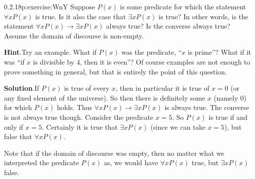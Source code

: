 \documentclass[twoside,11pt,]{book}
\newcommand{\blocktitlefont}{\relax}
\numberwithin{equation}{chapter}
\newcommand{\imp}{\rightarrow}
\begin{document}
\begin{divisionsolution}{0.2.18}{}{p:exercise:WnY}%
Suppose \(P(x)\) is some predicate for which the statement \(\forall x P(x)\) is true. Is it also the case that \(\exists x P(x)\) is true? In other words, is the statement \(\forall x P(x) \imp \exists x P(x)\) always true? Is the converse always true?  Assume the domain of discourse is non-empty.%
\par\smallskip%
\noindent\textbf{\blocktitlefont Hint}.\quad{}Try an example.  What if \(P(x)\) was the predicate, ``\(x\) is prime''?  What if it was ``if \(x\) is divisible by 4, then it is even''?  Of course examples are not enough to prove something in general, but that is entirely the point of this question.%
\par\smallskip%
\noindent\textbf{\blocktitlefont Solution}.\quad{}If \(P(x)\) is true of every \(x\), then in particular it is true of \(x = 0\) (or any fixed element of the universe). So then there is definitely some \(x\) (namely 0) for which \(P(x)\) holds. Thus \(\forall x P(x) \imp \exists x P(x)\) is always true. The converse is not always true though. Consider the predicate \(x = 5\). So \(P(x)\) is true if and only if \(x = 5\). Certainly it is true that \(\exists x P(x)\) (since we can take \(x = 5\)), but false that \(\forall x P(x)\).%
\par
Note that if the domain of discourse was empty, then no matter what we interpreted the predicate \(P(x)\) as, we would have \(\forall x P(x)\) true, but \(\exists x P(x)\) false.%
\end{divisionsolution}%
\end{document}
